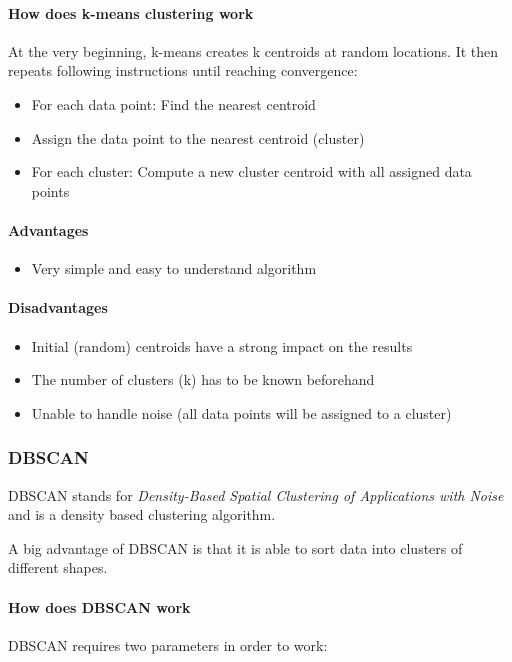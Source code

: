 \paragraph{How does k-means clustering work}
At the very beginning, k-means creates k centroids at random locations.
It then repeats following instructions until reaching convergence:

\begin{itemize}
    \item For each data point: Find the nearest centroid
    \item Assign the data point to the nearest centroid (cluster)
    \item For each cluster: Compute a new cluster centroid with all assigned data points
\end{itemize}

\paragraph{Advantages}
\begin{itemize}
    \item Very simple and easy to understand algorithm
\end{itemize}

\paragraph{Disadvantages}
\begin{itemize}
    \item Initial (random) centroids have a strong impact on the results
    \item The number of clusters (k) has to be known beforehand
    \item Unable to handle noise (all data points will be assigned to a cluster)
\end{itemize}

\subsubsection{DBSCAN}
DBSCAN stands for \textit{Density-Based Spatial Clustering of Applications with Noise}
and is a density based clustering algorithm.

A big advantage of DBSCAN is that it is able to sort data into clusters
of different shapes.

\paragraph{How does DBSCAN work}
DBSCAN requires two parameters in order to work:

